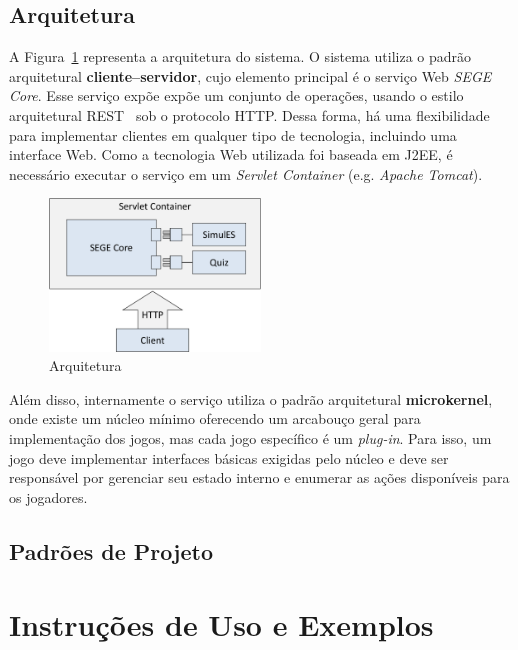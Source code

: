 \documentclass[12pt]{article}
\begin{document}
\subsection{Arquitetura}

A Figura~\ref{img:architecture} representa a arquitetura do sistema. O sistema utiliza o padrão arquitetural \textbf{cliente--servidor}, cujo elemento principal é o serviço Web \emph{SEGE Core}. Esse serviço expõe expõe um conjunto de operações, usando o estilo arquitetural REST~\cite{fielding2000rest} sob o protocolo HTTP. Dessa forma, há uma flexibilidade para implementar clientes em qualquer tipo de tecnologia, incluindo uma interface Web. Como a tecnologia Web utilizada foi baseada em J2EE, é necessário executar o serviço em um \emph{Servlet Container} (e.g. \emph{Apache Tomcat}).

\begin{figure}[htb]
\centering
\includegraphics[width=0.5\textwidth]{img/architecture.pdf}
\caption{Arquitetura}
\label{img:architecture}
\end{figure}

Além disso, internamente o serviço utiliza o padrão arquitetural \textbf{microkernel}, onde existe um núcleo mínimo oferecendo um arcabouço geral para implementação dos jogos, mas cada jogo específico é um \emph{plug-in}. Para isso, um jogo deve implementar interfaces básicas exigidas pelo núcleo e deve ser responsável por gerenciar seu estado interno e enumerar as ações disponíveis para os jogadores.


\subsection{Padrões de Projeto}



\section{Instruções de Uso e Exemplos}
\label{sec:examples}



\FloatBarrier


\end{document}
